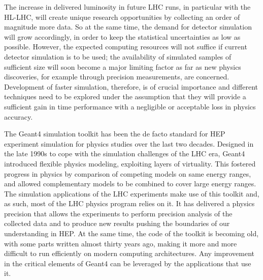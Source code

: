 \documentclass[10pt,a4paper]{article}
\begin{document}
The increase in delivered luminosity in future LHC runs, in particular
with the HL-LHC, will create unique research opportunities by collecting
an order of magnitude more data. So at the same time, the demand for
detector simulation will grow accordingly, in order to keep the
statistical uncertainties as low as possible. However, the expected
computing resources will not suffice if current detector simulation is
to be used; the availability of simulated samples of sufficient size
will soon become a major limiting factor as far as new physics
discoveries, for example through precision measurements, are concerned.
Development of faster simulation, therefore, is of crucial importance
and different techniques need to be explored under the assumption that
they will provide a sufficient gain in time performance with a
negligible or acceptable loss in physics accuracy.

The Geant4 simulation toolkit has been the de facto standard for HEP
experiment simulation for physics studies over the last two decades.
Designed in the late 1990s to cope with the simulation challenges of the
LHC era, Geant4 introduced flexible physics modeling, exploiting layers
of virtuality. This fostered progress in physics by comparison of
competing models on same energy ranges, and allowed complementary models
to be combined to cover large energy ranges. The simulation applications
of the LHC experiments make use of this toolkit and, as such, most of
the LHC physics program relies on it. It has delivered a physics
precision that allows the experiments to perform precision analysis of
the collected data and to produce new results pushing the boundaries of
our understanding in HEP. At the same time, the code of the toolkit is
becoming old, with some parts written almost thirty years ago, making it
more and more difficult to run efficiently on modern computing
architectures. Any improvement in the critical elements of Geant4 can be
leveraged by the applications that use it.
\end{document}
